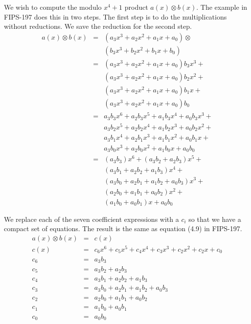 \documentclass{article}
\begin{document}
We wish to compute the modulo $x^4 + 1$ product $a(x) \otimes b(x)$.
The example in FIPS-197 does this in two steps.
The first step is to do the multiplications without reductions.
We save the reduction for the second step.
\begin{eqnarray*}
  a(x) \otimes b(x)
  &=& (a_3 x^3 + a_2 x^2 + a_1 x + a_0) \otimes \\
  & & (b_3 x^3 + b_2 x^2 + b_1 x + b_0) \\
  &=& (a_3 x^3 + a_2 x^2 + a_1 x + a_0) b_3 x^3 + \\
  & & (a_3 x^3 + a_2 x^2 + a_1 x + a_0) b_2 x^2 + \\
  & & (a_3 x^3 + a_2 x^2 + a_1 x + a_0) b_1 x + \\
  & & (a_3 x^3 + a_2 x^2 + a_1 x + a_0) b_0 \\
  &=& a_3 b_3 x^6 + a_2 b_3 x^5 + a_1 b_3 x^4 + a_0 b_3 x^3 + \\
  & & a_3 b_2 x^5 + a_2 b_2 x^4 + a_1 b_2 x^3 + a_0 b_2 x^2 + \\
  & & a_3 b_1 x^4 + a_2 b_1 x^3 + a_1 b_1 x^2 + a_0 b_1 x + \\
  & & a_3 b_0 x^3 + a_2 b_0 x^2 + a_1 b_0 x + a_0 b_0 \\
  &=& (a_3 b_3) x^6 + (a_3 b_2 + a_2 b_3) x^5 + \\
  & & (a_3 b_1 + a_2 b_2 + a_1 b_3) x^4 + \\
  & & (a_3 b_0 + a_2 b_1 + a_1 b_2 + a_0 b_3) x^3 + \\
  & & (a_2 b_0 + a_1 b_1 + a_0 b_2) x^2 + \\
  & & (a_1 b_0 + a_0 b_1) x + a_0 b_0
\end{eqnarray*}

\newpage
We replace each of the seven coefficient expressions with a $c_i$
so that we have a compact set of equations.
The result is the same as equation (4.9) in FIPS-197.
\begin{eqnarray*}
  a(x) \otimes b(x) &=& c(x) \\
  c(x) &=& c_6 x^6 + c_5 x^5 + c_4 x^4 + c_3 x^3 + c_2 x^2 + c_2 x + c_0 \\
  c_6 &=& a_3 b_3 \\
  c_5 &=& a_3 b_2 + a_2 b_3 \\
  c_4 &=& a_3 b_1 + a_2 b_2 + a_1 b_3 \\
  c_3 &=& a_3 b_0 + a_2 b_1 + a_1 b_2 + a_0 b_3 \\
  c_2 &=& a_2 b_0 + a_1 b_1 + a_0 b_2 \\
  c_1 &=& a_1 b_0 + a_0 b_1 \\
  c_0 &=& a_0 b_0
\end{eqnarray*}
\end{document}

